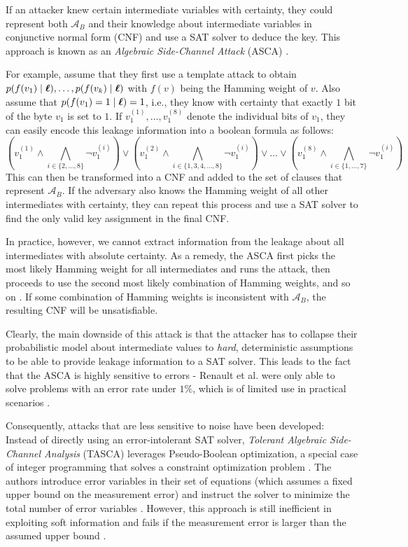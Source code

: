 If an attacker knew certain intermediate variables with certainty, they could represent both $\mathcal{A}_B$ and their knowledge about intermediate variables in conjunctive normal form (CNF) and use a SAT solver to deduce the key. This approach is known as an \textit{Algebraic Side-Channel Attack} (ASCA) \cite{asca}.

For example, assume that they first use a template attack to obtain $p(f(v_1) \mid \boldsymbol{\ell}), \dots, p(f(v_k) \mid \boldsymbol{\ell})$ with $f(v)$ being the Hamming weight of $v$. Also assume that $p(f(v_1) = 1 \mid \boldsymbol{\ell}) = 1$, i.e., they know with certainty that exactly $1$ bit of the byte $v_1$ is set to $1$. If $v_1^{(1)},\dots,v_1^{(8)}$ denote the individual bits of $v_1$, they can easily encode this leakage information into a boolean formula as follows:
\begin{equation}
    \left( v_1^{(1)} \land \bigwedge_{i \in \{2,\dots,8\}} \neg v_1^{(i)} \right) \lor \left( v_1^{(2)} \land \bigwedge_{i \in \{1,3,4,\dots,8\}} \neg v_1^{(i)} \right) \lor \dots \lor \left( v_1^{(8)} \land \bigwedge_{i \in \{1,\dots,7\}} \neg v_1^{(i)} \right)
\end{equation}
This can then be transformed into a CNF and added to the set of clauses that represent $\mathcal{A}_B$. If the adversary also knows the Hamming weight of all other intermediates with certainty, they can repeat this process and use a SAT solver to find the only valid key assignment in the final CNF.

In practice, however, we cannot extract information from the leakage about all intermediates with absolute certainty. As a remedy, the ASCA first picks the most likely Hamming weight for all intermediates and runs the attack, then proceeds to use the second most likely combination of Hamming weights, and so on \cite{asca}. If some combination of Hamming weights is inconsistent with $\mathcal{A}_B$, the resulting CNF will be unsatisfiable.

Clearly, the main downside of this attack is that the attacker has to collapse their probabilistic model about intermediate values to \textit{hard}, deterministic assumptions to be able to provide leakage information to a SAT solver. This leads to the fact that the ASCA is highly sensitive to errors - Renault et al. \cite{asca_aes} were only able to solve problems with an error rate under $1\%$, which is of limited use in practical scenarios \cite{tasca}.

Consequently, attacks that are less sensitive to noise have been developed: Instead of directly using an error-intolerant SAT solver, \textit{Tolerant Algebraic Side-Channel Analysis} (TASCA) leverages Pseudo-Boolean optimization, a special case of integer programming that solves a constraint optimization problem \cite{tasca}.
The authors introduce error variables in their set of equations (which assumes a fixed upper bound on the measurement error) and instruct the solver to minimize the total number of error variables \cite{tasca}. However, this approach is still inefficient in exploiting soft information and fails if the measurement error is larger than the assumed upper bound \cite{sasca}.

